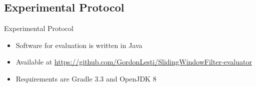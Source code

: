 \subsection{Experimental Protocol}

\begin{frame}{Experimental Protocol}
    \begin{itemize}
        \item Software for evaluation is written in Java
        \pause
        \item Available at \url{https://github.com/GordonLesti/SlidingWindowFilter-evaluator}
        \pause
        \item Requirements are Gradle 3.3 and OpenJDK 8
    \end{itemize}
\end{frame}



